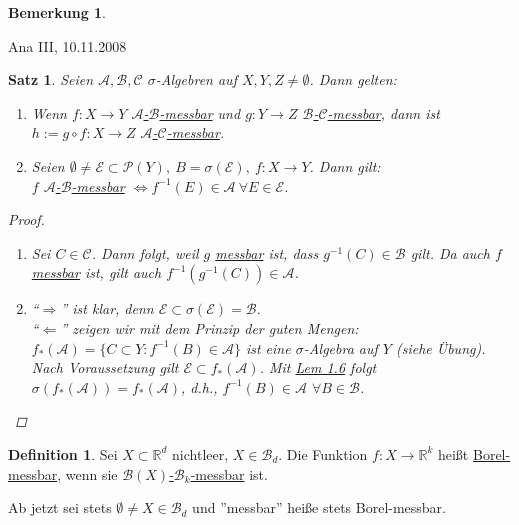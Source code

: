 \documentclass[a4paper]{report}
\newcommand{\PowerSet}{\mathcal{P}}
\newcommand{\R}{\mathbb{R}}
\newcommand{\Borel}{\mathcal{B}}
\newcommand{\Bd}{\Borel_d}
\newcommand{\jlabel}[1]{\label{j_#1}}
\newcommand{\jhyperref}[2]{\hyperref[j_#1]{#2}}
\newcommand{\jlink}[1]{\jhyperref{#1}{#1}}
\newcommand{\mb}[2]{\jhyperref{messbar}{#1-#2-messbar}}
\newcommand{\calMb}[2]{\mb{$\mathcal{#1}$}{$\mathcal{#2}$}}
\newcommand{\jabb}[3]{ #1: #2 \rightarrow #3 }
\newcommand{\jsigalg}{$\sigma$-Algebra}
\newcommand{\jspacesmall}{\vspace{4pt}}
\newcommand{\jdate}[1]{\jspacesmall\begin{center}\jlabel{#1}\tiny{Ana III, #1}\end{center}}
\theoremstyle{plain}
\newtheorem{satz}[thm]{Satz}
\theoremstyle{definition}
\newtheorem{defn}[thm]{Definition}
\newtheorem{bem}[thm]{Bemerkung}
\begin{document}
{{{\begin{bem}
\begin{enumerate}
        
    \end{enumerate}
\end{bem}

\jdate{10.11.2008}

\begin{satz}
\jlabel{Satz 2.3}
    Seien $\mathcal{A}, \Borel, \mathcal{C}$ $\sigma$-Algebren auf $X,Y,Z \ne \emptyset$. Dann gelten:
    \begin{enumerate}
        \item Wenn $\jabb{f}{X}{Y}$ \calMb{A}{B} und $\jabb{g}{Y}{Z}$ \calMb{B}{C}, dann ist $\jabb{h:= g \circ f}{X}{Z}$ \calMb{A}{C}.
        \item Seien $\emptyset \ne \mathcal{E} \subset \PowerSet(Y), \ B = \sigma(\mathcal{E}),\ \jabb{f}{X}{Y}$. Dann gilt:\\
        $f$ \calMb{A}{B} $\Leftrightarrow f^{-1}(E) \in \mathcal{A} \ \forall E \in \mathcal{E}$.
    \end{enumerate}
    \begin{proof}
        \begin{enumerate}
            \item 
                Sei $C\in \mathcal{C}$. Dann folgt, weil $g$ \jlink{messbar} ist, dass $g^{-1}(C)\in \Borel$ gilt. Da auch $f$ \jlink{messbar} ist, gilt auch $f^{-1}(g^{-1}(C))\in \mathcal{A}$.
            \item
                ``$\Rightarrow$'' ist klar, denn $\mathcal{E}\subset \sigma(\mathcal{E}) = \Borel$.\\
                ``$\Leftarrow$'' zeigen wir mit dem Prinzip der guten Mengen:\\
                $f_*(\mathcal{A}) = \{C\subset Y : f^{-1}(B) \in \mathcal{A}\}$ ist eine \jsigalg{} auf $Y$ (siehe Übung). Nach Voraussetzung gilt $\mathcal{E} \subset f_*(\mathcal{A})$. Mit \jlink{Lem 1.6} folgt $\sigma(f_*(\mathcal{A})) = f_*(\mathcal{A})$, d.h., $f^{-1}(B)\in \mathcal{A}$ $\forall B\in \Borel$.
        \end{enumerate}
    \end{proof}
\end{satz}

\begin{defn}
\jlabel{Def 2.4}
    Sei $X \subset \R^d$ nichtleer, $X\in \Bd$. Die Funktion $\jabb{f}{X}{\R^k}$ heißt \uline{Borel-messbar}, wenn sie \mb{$\Borel(X)$}{$\Borel_k$} ist.
\end{defn}
Ab jetzt sei stets $\emptyset \ne X \in \Bd$ und ''messbar'' heiße stets Borel-messbar.

}}}
\end{document}
